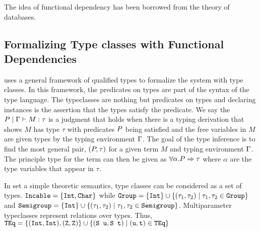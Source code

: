 \documentclass[format=sigplan,manuscript,review,screen, nonacm]{acmart}
\begin{document}
The idea of functional dependency has been borrowed from the theory of
databases\cite{codd_realtional_1970, amstrong_dependency_1974}.

\subsection{Formalizing Type classes with Functional Dependencies}
\cite{jones_qualified_1994} uses a general framework
of qualified types to formalize the system with type classes.
In this framework, the predicates on types are part of the syntax of the type language.
The typeclasses are nothing but predicates on types
and declaring instances is the assertion that the types satisfy the predicate.
We say the $P \mid \Gamma \vdash M : \tau$ is a judgment
that holds when there is a typing derivation that shows $M$ has type $\tau$
with predicates $P$ being satisfied and the free variables in $M$
are given types by the typing environment $\Gamma$. The goal of the type inference
is to find the most general pair, $(P, \tau)$ for a given term $M$ and typing
environment $\Gamma$. The principle type for the term can then be given as
$\forall \alpha. P \Rightarrow \tau$ where $\alpha$ are the type variables that appear in $\tau$.




In set a simple theoretic semantics, type classes can be considered as a set of types.
$\texttt{Incable} = \{\texttt{Int}, \texttt{Char}\}$ while
$\texttt{Group} = \{\texttt{Int}\} \cup \{(\tau_1, \tau_2) \mid \tau_1, \tau_2 \in \texttt{Group}\}$ and
$\texttt{Semigroup} = \{\texttt{Int}\} \cup \{(\tau_1, \tau_2) \mid \tau_1, \tau_2 \in \texttt{Semigroup}\}$.
Multiparameter typeclasses represent relations over types.
Thus, $\texttt{TEq} = \{(\texttt{Int}, \texttt{Int}),  (\texttt{Z}, \texttt{Z})\}
\cup \{(\texttt{S u}, \texttt{S t}) \mid (\texttt{u}, \texttt{t}) \in \texttt{TEq}\} $


\end{document}
